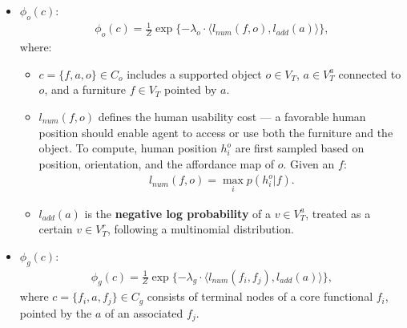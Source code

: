 \documentclass[10pt]{article}
\begin{document}
\begin{itemize}
\begin{itemize}
\begin{figure}[!htpb]
        \end{figure}
    \end{itemize}
  \item $\phi_o(c)$:
    \begin{align}
      \label{eq:7}
      \phi_o(c) = \frac{1}{Z} \exp\{-\lambda_o \cdot \langle l_{num}(f, o), l_{add}(a) \rangle\},
    \end{align}
    where:
    \begin{itemize}
      \item $c = \{f, a, o\} \in C_o$ includes a supported object $o \in V_T$,
        $a \in V^a_T$ connected to $o$, and a furniture $f \in V_T$ pointed by
        $a$.
      \item $l_{num}(f, o)$ defines the human usability cost --- a favorable
        human position should enable agent to access or use both the furniture
        and the object. To compute, human position $h^o_i$ are first sampled
        based on position, orientation, and the affordance map of $o$. Given an
        $f$:
        \begin{align}
          \label{eq:8}
          l_{num}(f, o) = \max_i p(h^o_i \vert f).
        \end{align}
      \item $l_{add}(a)$ is the \textbf{negative log probability} of a
        $v \in V^a_T$, treated as a certain $v \in V^r_T$, following a
        multinomial distribution.
    \end{itemize}
  \item $\phi_g(c)$:
    \begin{align}
      \label{eq:9}
      \phi_g(c) = \frac{1}{Z} \exp\{-\lambda_g \cdot \langle l_{num}(f_i, f_j), l_{add}(a) \rangle\},
    \end{align}
    where $c = \{f_i, a, f_j\} \in C_g$ consists of terminal nodes of a core
    functional $f_i$, pointed by the $a$ of an associated $f_j$.
\end{itemize}
\end{document}
